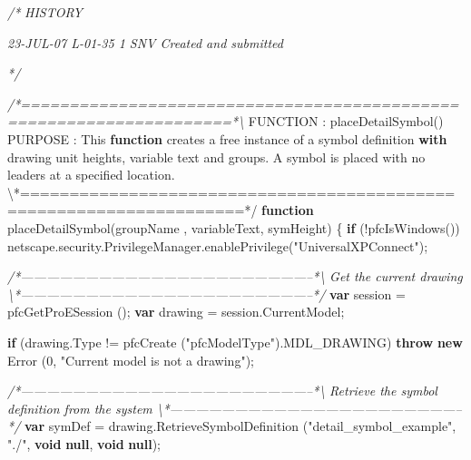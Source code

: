 \documentclass[]{article}
\newenvironment{Shaded}{}{}
\newcommand{\KeywordTok}[1]{\textcolor[rgb]{0.00,0.44,0.13}{\textbf{{#1}}}}
\newcommand{\DecValTok}[1]{\textcolor[rgb]{0.25,0.63,0.44}{{#1}}}
\newcommand{\StringTok}[1]{\textcolor[rgb]{0.25,0.44,0.63}{{#1}}}
\newcommand{\CommentTok}[1]{\textcolor[rgb]{0.38,0.63,0.69}{\textit{{#1}}}}
\newcommand{\OtherTok}[1]{\textcolor[rgb]{0.00,0.44,0.13}{{#1}}}
\newcommand{\FunctionTok}[1]{\textcolor[rgb]{0.02,0.16,0.49}{{#1}}}
\newcommand{\NormalTok}[1]{{#1}}
\begin{document}
\begin{Shaded}
\begin{Highlighting}[]
\CommentTok{/*  }
\CommentTok{   HISTORY}

\CommentTok{23-JUL-07   L-01-35   $$1  SNV     Created and submitted}

\CommentTok{*/}

\CommentTok{/*====================================================================*\textbackslash{}}
 \NormalTok{FUNCTION : }\FunctionTok{placeDetailSymbol}\NormalTok{() }
 \NormalTok{PURPOSE  : This }\KeywordTok{function} \NormalTok{creates a free instance of a symbol }
            \NormalTok{definition }\KeywordTok{with} \NormalTok{drawing unit heights, variable text and }
            \OtherTok{groups}\NormalTok{. }\FunctionTok{A} \FunctionTok{symbol} \FunctionTok{is} \FunctionTok{placed} \FunctionTok{with} \FunctionTok{no} \FunctionTok{leaders} \FunctionTok{at} \FunctionTok{a} \FunctionTok{specified} 
            \OtherTok{location}\NormalTok{.  }
\NormalTok{\textbackslash{}*====================================================================*}\OtherTok{/}
\KeywordTok{function} \FunctionTok{placeDetailSymbol}\NormalTok{(groupName , variableText, symHeight)}
\NormalTok{\{}
  \KeywordTok{if} \NormalTok{(!}\FunctionTok{pfcIsWindows}\NormalTok{())}
    \OtherTok{netscape}\NormalTok{.}\OtherTok{security}\NormalTok{.}\OtherTok{PrivilegeManager}\NormalTok{.}\FunctionTok{enablePrivilege}\NormalTok{(}\StringTok{"UniversalXPConnect"}\NormalTok{); }

 \CommentTok{/*--------------------------------------------------------------------*\textbackslash{} }
\CommentTok{   Get the current drawing}
\CommentTok{ \textbackslash{}*--------------------------------------------------------------------*/}
  \KeywordTok{var} \NormalTok{session = }\FunctionTok{pfcGetProESession} \NormalTok{();}
  \KeywordTok{var} \NormalTok{drawing = }\OtherTok{session}\NormalTok{.}\FunctionTok{CurrentModel}\NormalTok{;}

  
  \KeywordTok{if} \NormalTok{(}\OtherTok{drawing}\NormalTok{.}\FunctionTok{Type} \NormalTok{!= }\FunctionTok{pfcCreate} \NormalTok{(}\StringTok{"pfcModelType"}\NormalTok{).}\FunctionTok{MDL_DRAWING}\NormalTok{)}
    \KeywordTok{throw} \KeywordTok{new} \FunctionTok{Error} \NormalTok{(}\DecValTok{0}\NormalTok{, }\StringTok{"Current model is not a drawing"}\NormalTok{);}
      
\CommentTok{/*--------------------------------------------------------------------*\textbackslash{}  }
\CommentTok{  Retrieve the symbol definition from the system}
\CommentTok{\textbackslash{}*--------------------------------------------------------------------*/}    
  \KeywordTok{var} \NormalTok{symDef = }\OtherTok{drawing}\NormalTok{.}\FunctionTok{RetrieveSymbolDefinition} \NormalTok{(}\StringTok{"detail_symbol_example"}\NormalTok{, }
                         \StringTok{"./"}\NormalTok{, }\KeywordTok{void} \KeywordTok{null}\NormalTok{, }\KeywordTok{void} \KeywordTok{null}\NormalTok{);}
  

\end{Highlighting}
\end{Shaded}
\end{document}
